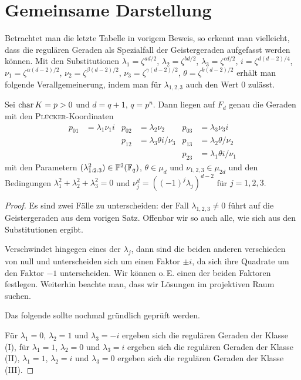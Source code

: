\section{Gemeinsame Darstellung}
Betrachtet man die letzte Tabelle in vorigem Beweis, so erkennt man vielleicht, dass die regulären Geraden als Spezialfall der Geistergeraden aufgefasst werden können. Mit den Substitutionen $\lambda_1 = \zeta^{ad/2}$, $\lambda_2 = \zeta^{bd/2}$, $\lambda_3 = \zeta^{cd/2}$, $i = \zeta^{d(d-2)/4}$, $\nu_1 = \zeta^{\alpha(d-2)/2}$, $\nu_2 = \zeta^{\beta(d-2)/2}$, $\nu_3 = \zeta^{\gamma(d-2)/2}$, $\theta = \zeta^{k(d-2)/2}$ erhält man folgende Verallgemeinerung, indem man für $\lambda_{1,2,3}$ auch den Wert $0$ zulässt.
\begin{coroll}
Sei $\operatorname{char} K = p > 0$ und $d = q+1$, $q = p^n$. Dann liegen auf $F_d$ genau die Geraden mit den \textsc{Plücker}-Koordinaten
\begin{align*}
p_{01} &= \lambda_1 \nu_1 i &p_{02} &= \lambda_2 \nu_2 &p_{03} &= \lambda_3 \nu_3 i \\
 & &p_{12} &= \lambda_3 \theta i / \nu_3 &p_{13} &= \lambda_2 \theta / \nu_2 \\
 & & & &p_{23} &= \lambda_1 \theta i / \nu_1
\end{align*}
mit den Parametern $(\lambda_{1:2:3}^2) \in \mathbb P^{2}(\mathbb F_q)$, $\theta \in \mu_d$ und $\nu_{1,2,3} \in \mu_{2d}$ und den Bedingungen $\lambda_1^2 + \lambda_2^2 + \lambda_3^2 = 0$ und $\nu_j^d = ((-1)^j \lambda_j)^{d-2}$ für $j=1,2,3$.
\end{coroll}
\begin{proof}
Es sind zwei Fälle zu unterscheiden: der Fall $\lambda_{1,2,3} \neq 0$ führt auf die Geistergeraden aus dem vorigen Satz. Offenbar wir so auch alle, wie sich aus den Substitutionen ergibt.

Verschwindet hingegen eines der $\lambda_j$, dann sind die beiden anderen verschieden von null und unterscheiden sich um einen Faktor $\pm i$, da sich ihre Quadrate um den Faktor $-1$ unterscheiden. Wir können o.\,E. einen der beiden Faktoren festlegen. Weiterhin beachte man, dass wir Lösungen im projektiven Raum suchen.

\todo Das folgende sollte nochmal gründlich geprüft werden.

Für $\lambda_1 = 0$, $\lambda_2 = 1$ und $\lambda_3 = -i$ ergeben sich die regulären Geraden der Klasse (I), für $\lambda_1 = 1$, $\lambda_2 = 0$ und $\lambda_3 = i$ ergeben sich die regulären Geraden der Klasse (II), $\lambda_1 = 1$, $\lambda_2 = i$ und $\lambda_3 = 0$ ergeben sich die regulären Geraden der Klasse (III).
\end{proof}
